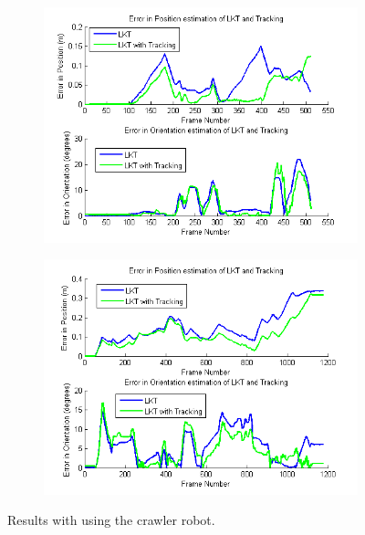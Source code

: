 \documentclass[letterpaper, 10 pt, conference]{ieeeconf}
\begin{document}
\begin{figure}[tb]
	\centering
	\begin{subfigure}{\columnwidth}
		  \centering
		  \includegraphics[width=\columnwidth]{crawler1_results.png}
		  \label{crawler:pattern1}
	\end{subfigure}
	\begin{subfigure}{\columnwidth}
		  \centering
		  \includegraphics[width=\columnwidth]{crawler2_results.png}
		  \label{crawler:pattern2}
	\end{subfigure}
	\caption{Results with using the crawler robot.}
    \label{crawler}
\end{figure}
\end{document}
